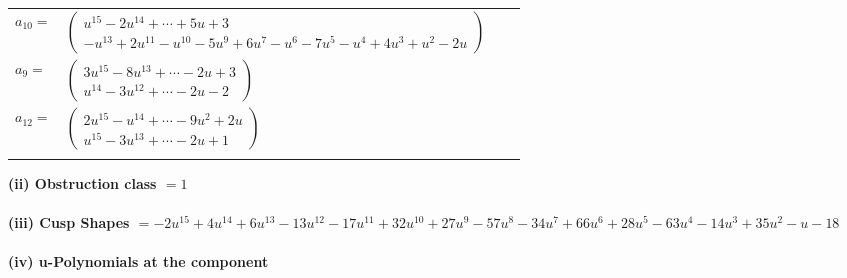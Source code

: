 \documentclass[1p]{elsarticle_modified}
\theoremstyle{definition}
\begin{document}
\begin{tabular}{m{7pt} m{180pt} m{7pt} m{180pt} }
\flushright $a_{10}=$&$\begin{pmatrix}u^{15}-2 u^{14}+\cdots+5 u+3\\- u^{13}+2 u^{11}- u^{10}-5 u^9+6 u^7- u^6-7 u^5- u^4+4 u^3+u^2-2 u\end{pmatrix}$ \\
\flushright $a_{9}=$&$\begin{pmatrix}3 u^{15}-8 u^{13}+\cdots-2 u+3\\u^{14}-3 u^{12}+\cdots-2 u-2\end{pmatrix}$ \\
\flushright $a_{12}=$&$\begin{pmatrix}2 u^{15}- u^{14}+\cdots-9 u^2+2 u\\u^{15}-3 u^{13}+\cdots-2 u+1\end{pmatrix}$\\&\end{tabular}
\flushleft \textbf{(ii) Obstruction class $= 1$}\\~\\
\flushleft \textbf{(iii) Cusp Shapes $= -2 u^{15}+4 u^{14}+6 u^{13}-13 u^{12}-17 u^{11}+32 u^{10}+27 u^9-57 u^8-34 u^7+66 u^6+28 u^5-63 u^4-14 u^3+35 u^2- u-18$}\\~\\
\newpage\renewcommand{\arraystretch}{1}
\flushleft \textbf{(iv) u-Polynomials at the component}\newline \\
\end{document}
